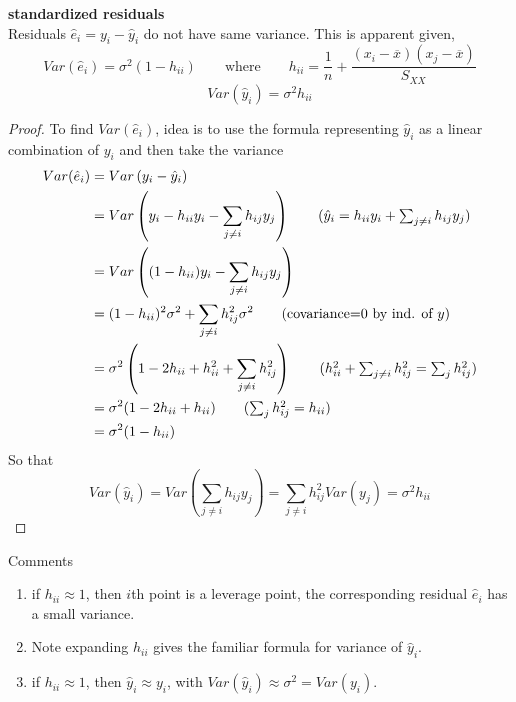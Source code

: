 \documentclass[11pt]{article}
\begin{document}
\begin{defn*}
    \textbf{standardized residuals} \\
    Residuals $\hat{e}_i = y_i - \hat{y}_i$ do not have same variance. This is apparent given, 
    \[
        Var(\hat{e}_i) = \sigma^2 (1-h_{ii}) 
        \quad \quad \text{where} \quad \quad 
        h_{ii} = \frac{1}{n} + \frac{(x_i - \overline{x})(x_j - \overline{x})}{S_{XX}}
    \]
    \[
        Var(\hat{y}_i) = \sigma^2 h_{ii}
    \]
    \begin{proof}
        To find $Var(\hat{e}_i)$, idea is to use the formula representing $\hat{y}_i$ as a linear combination of $y_i$ and then take the variance
        \begin{align*}
            Var(\hat{e}_i) 
            &= Var\left( y_i - \hat{y}_i \right) \\
            &= Var\left( y_i - h_{ii}y_i - \sum_{j\neq i}h_{ij} y_j \right) 
                \tag{$ \hat{y}_i = h_{ii}y_i + \sum_{j\neq i}h_{ij} y_j $} \\ 
            &= Var\left( (1-h_{ii})y_i - \sum_{j\neq i}h_{ij} y_j \right) \\
            &= (1-h_{ii})^2 \sigma^2 + \sum_{j\neq i} h_{ij}^2 \sigma^2 \tag{covariance=0 by ind. of $y$}\\
            &= \sigma^2 \left( 1 - 2h_{ii} + h_{ii}^2 + \sum_{j\neq i} h_{ij}^2 \right)     
                \tag{$h_{ii}^2 + \sum_{j\neq i} h_{ij}^2 = \sum_j h_{ij}^2$} \\
            &= \sigma^2 (1 - 2h_{ii} + h_{ii}) 
                \tag{$\sum_{j} h_{ij}^2 = h_{ii}$} \\ 
            &= \sigma^2 (1 - h_{ii})
        \end{align*}
        So that 
        \[
            Var(\hat{y}_i) = Var(\sum_{j\neq i} h_{ij}y_j) 
            = \sum_{j\neq i} h_{ij}^2 Var(y_j)
            = \sigma^2 h_{ii}
        \]
    \end{proof}
    Comments
    \begin{enumerate}
        \item if $h_{ii} \approx 1$, then $i$th point is a leverage point, the corresponding residual $\hat{e}_i$ has a small variance. 
        \item Note expanding $h_{ii}$ gives the familiar formula for variance of $\hat{y}_i$.
        \item if $h_{ii} \approx 1$, then $\hat{y}_i \approx y_i$, with $Var(\hat{y}_i) \approx \sigma^2 = Var(y_i)$.
    \end{enumerate}

\end{defn*}
\end{document}

